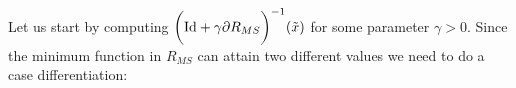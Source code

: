         Let us start by computing $\bigg( \textnormal{Id} + \gamma\partial R_{MS} \bigg)^{-1}(\tilde{x})$ for some parameter $\gamma > 0$. Since the minimum function in $R_{MS}$ can attain two different values we need to do a case differentiation:
